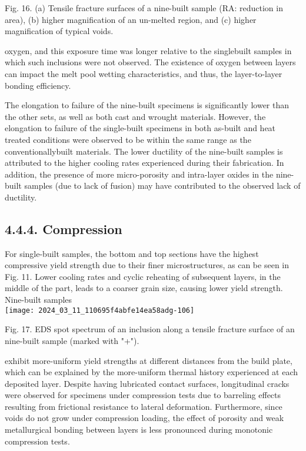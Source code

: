 \documentclass[10pt]{article}
\begin{document}
Fig. 16. (a) Tensile fracture surfaces of a nine-built sample (RA: reduction in area), (b) higher magnification of an un-melted region, and (c) higher magnification of typical voids.

oxygen, and this exposure time was longer relative to the singlebuilt samples in which such inclusions were not observed. The existence of oxygen between layers can impact the melt pool wetting characteristics, and thus, the layer-to-layer bonding efficiency.

The elongation to failure of the nine-built specimens is significantly lower than the other sets, as well as both cast and wrought materials. However, the elongation to failure of the single-built specimens in both as-built and heat treated conditions were observed to be within the same range as the conventionallybuilt materials. The lower ductility of the nine-built samples is attributed to the higher cooling rates experienced during their fabrication. In addition, the presence of more micro-porosity and intra-layer oxides in the nine-built samples (due to lack of fusion) may have contributed to the observed lack of ductility.

\subsection*{4.4.4. Compression}
For single-built samples, the bottom and top sections have the highest compressive yield strength due to their finer microstructures, as can be seen in Fig. 11. Lower cooling rates and cyclic reheating of subsequent layers, in the middle of the part, leads to a coarser grain size, causing lower yield strength. Nine-built samples\\
\texttt{[image: 2024\_03\_11\_110695f4abfe14ea58adg-106]}

Fig. 17. EDS spot spectrum of an inclusion along a tensile fracture surface of an nine-built sample (marked with "+").

exhibit more-uniform yield strengths at different distances from the build plate, which can be explained by the more-uniform thermal history experienced at each deposited layer. Despite having lubricated contact surfaces, longitudinal cracks were observed for specimens under compression tests due to barreling effects resulting from frictional resistance to lateral deformation. Furthermore, since voids do not grow under compression loading, the effect of porosity and weak metallurgical bonding between layers is less pronounced during monotonic compression tests.
\end{document}
